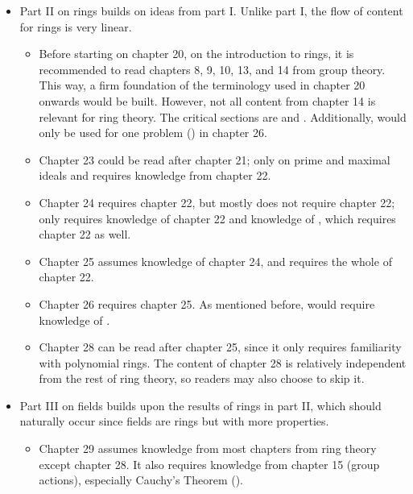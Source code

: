 \begin{itemize}
\begin{itemize}
    \end{itemize}
    \item Part II on rings builds on ideas from part I. Unlike part I, the flow of content for rings is very linear.
    \begin{itemize}
        \item Before starting on chapter 20, on the introduction to rings, it is recommended to read chapters 8, 9, 10, 13, and 14 from group theory. This way, a firm foundation of the terminology used in chapter 20 onwards would be built. However, not all content from chapter 14 is relevant for ring theory. The critical sections are  and . Additionally,  would only be used for one problem () in chapter 26.
        \item Chapter 23 could be read after chapter 21; only  on prime and maximal ideals and  requires knowledge from chapter 22.
        \item Chapter 24 requires chapter 22, but mostly does not require chapter 22; only  requires knowledge of chapter 22 and knowledge of , which requires chapter 22 as well.
        \item Chapter 25 assumes knowledge of chapter 24, and requires the whole of chapter 22.
        \item Chapter 26 requires chapter 25. As mentioned before,  would require knowledge of .
        \item Chapter 28 can be read after chapter 25, since it only requires familiarity with polynomial rings. The content of chapter 28 is relatively independent from the rest of ring theory, so readers may also choose to skip it.
    \end{itemize}
    \item Part III on fields builds upon the results of rings in part II, which should naturally occur since fields are rings but with more properties.
    \begin{itemize}
        \item Chapter 29 assumes knowledge from most chapters from ring theory except chapter 28. It also requires knowledge from chapter 15 (group actions), especially Cauchy's Theorem ().

\end{itemize}
\end{itemize}
